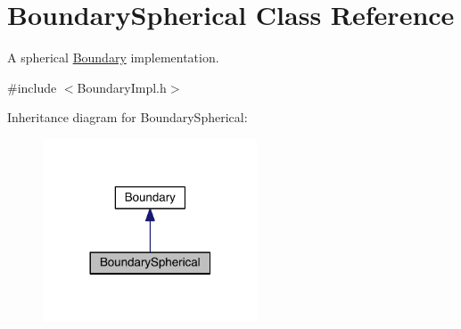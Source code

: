 \hypertarget{classBoundarySpherical}{\section{Boundary\+Spherical Class Reference}
\label{classBoundarySpherical}
}


A spherical \hyperlink{classBoundary}{Boundary} implementation.  




{\ttfamily \#include $<$Boundary\+Impl.\+h$>$}



Inheritance diagram for Boundary\+Spherical\+:\nopagebreak
\begin{figure}[H]
\begin{center}
\leavevmode
\includegraphics[width=180pt]{classBoundarySpherical__inherit__graph}
\end{center}
\end{figure}


